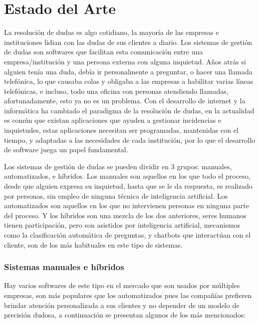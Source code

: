 \chapter{Estado del Arte}\label{chapter:state-of-the-art}

La resolución de dudas es algo cotidiano, la mayoría de las empresas e instituciones lidian con las dudas de sus clientes a diario. Los sistemas de gestión de dudas son softwares que facilitan esta comunicación entre una empresa/institución y una persona externa con alguna inquietud. Años atrás si alguien tenía una duda, debía ir personalmente a preguntar, o hacer una llamada telefónica, lo que causaba colas y obligaba a las empresas a habilitar varias líneas telefónicas, e incluso, todo una oficina con personas atendiendo llamadas, afortunadamente, esto ya no es un problema. Con el desarrollo de internet y la informática ha cambiado el paradigma de la resolución de dudas, en la actualidad es común que existan aplicaciones que ayuden a gestionar incidencias e inquietudes, estas aplicaciones necesitan ser programadas, mantenidas con el tiempo, y adaptadas a las necesidades de cada institución, por lo que el desarrollo de software juega un papel fundamental.
\newline

Los sistemas de gestión de dudas se pueden dividir en 3 grupos: manuales, automatizados, e híbridos. Los manuales son aquellos en los que todo el proceso, desde que alguien expresa su inquietud, hasta que se le da respuesta, es realizado por personas, sin empleo de ninguna técnica de inteligencia artificial. Los automatizados son aquellos en los que no intervienen personas en ninguna parte del proceso. Y los híbridos son una mezcla de los dos anteriores, seres humanos tienen participación, pero son asistidos por inteligencia artificial, mecanismos como la clasificación automática de preguntas, y chatbots que interactúan con el cliente, son de los más habituales en este tipo de sistemas. 

\subsection{Sistemas manuales e híbridos}

Hay varios softwares de este tipo en el mercado que son usados por múltiples empresas, son más populares que los automatizados pues las compañías prefieren brindar atención personalizada a sus clientes y no depender de un modelo de precisión dudosa, a continuación se presentan algunos de los más mencionados:
\newline

